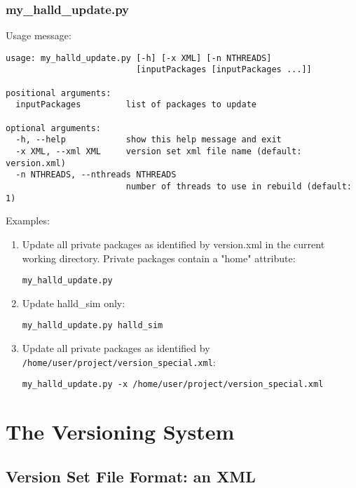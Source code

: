 \documentclass[12pt, letterpaper]{article}
\begin{document}
\subsubsection{my\_halld\_update.py}

Usage message:

\begin{verbatim}
usage: my_halld_update.py [-h] [-x XML] [-n NTHREADS]
                          [inputPackages [inputPackages ...]]

positional arguments:
  inputPackages         list of packages to update

optional arguments:
  -h, --help            show this help message and exit
  -x XML, --xml XML     version set xml file name (default: version.xml)
  -n NTHREADS, --nthreads NTHREADS
                        number of threads to use in rebuild (default: 1)
\end{verbatim}

Examples:

\begin{enumerate}
\item Update all private packages as identified by version.xml in the current working directory. Private packages contain a "home" attribute:

\begin{verbatim}
my_halld_update.py
\end{verbatim}

\item Update halld\_sim only:

\begin{verbatim}
my_halld_update.py halld_sim
\end{verbatim}

\item Update all private packages as identified by {\tt /home/user/project/version\_special.xml}:

\begin{verbatim}
my_halld_update.py -x /home/user/project/version_special.xml
\end{verbatim}

\end{enumerate}

\section{The Versioning System}\label{section:versioning}

\subsection{Version Set File Format: an XML}
\end{document}
